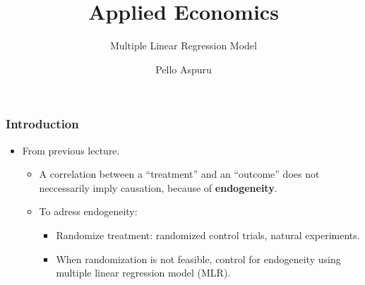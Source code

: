 \documentclass[11pt, aspectratio = 169]{beamer}
\title{Applied Economics}
\subtitle{Multiple Linear Regression Model}
\author{Pello Aspuru}
\date{}
\institute{Winter 2025/26}
\begin{document}
%

\maketitle

\begin{frame}\frametitle{Introduction}
    \begin{itemize}
        \item From previous lecture.
        \begin{itemize}
            \item A correlation between a ``treatment'' and an ``outcome'' does not neccessarily imply causation, because of \textbf{endogeneity}.
            \item To adress endogeneity:
                \begin{itemize}
                    \item Randomize treatment: randomized control trials, natural experiments.
                    \item When randomization is not feasible, control for endogeneity using multiple linear regression model (MLR).
                \end{itemize}
        \end{itemize}
    \end{itemize}
\end{frame}

\end{document}
